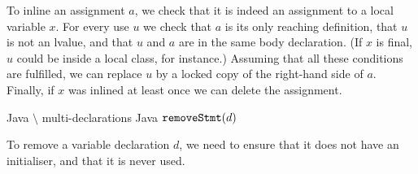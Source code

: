To inline an assignment $a$, we check that it is indeed an assignment to a local variable $x$. For every use $u$ we check that $a$ is its only reaching definition, that $u$ is not an lvalue, and that $u$ and $a$ are in the same body declaration. (If $x$ is final, $u$ could be inside a local class, for instance.) Assuming that all these conditions are fulfilled, we can replace $u$ by a locked copy of the right-hand side of $a$. Finally, if $x$ was inlined at least once we can delete the assignment.

\begin{algorithm}
\caption{$\refactoring{Remove Decl}(d : \type{LocalVarDecl})$}
\begin{algorithmic}[1]
\REQUIRE Java $\setminus$ multi-declarations
\ENSURE Java
\medskip
{}
  \STATE $\text{\texttt{removeStmt}}(d)$
\ENDIF
\end{algorithmic}
\end{algorithm}

To remove a variable declaration $d$, we need to ensure that it does not have an initialiser, and that it is never used.
